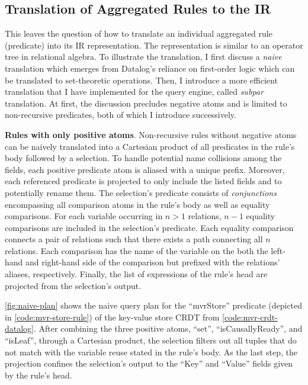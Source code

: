 \subsection{Translation of Aggregated Rules to the \acs{IR}}

This leaves the question of how to translate an individual aggregated rule
(predicate) into its \ac{IR} representation.
The representation is similar to an operator tree in relational algebra.
To illustrate the translation, I first discuss a \emph{naive} translation
which emerges from Datalog's reliance on first-order logic which can be
translated to set-theoretic operations.
Then, I introduce a more efficient translation that I have implemented
for the query engine, called \emph{subpar} translation.
At first, the discussion precludes negative atoms and is limited to
non-recursive predicates, both of which I introduce successively.

\textbf{Rules with only positive atoms}.
Non-recursive rules without negative atoms can be naively translated
into a Cartesian product of all predicates in the rule's body followed by
a selection.
To handle potential name collisions among the fields,
each positive predicate atom is aliased with a unique prefix.
Moreover, each referenced predicate is projected to only include the listed
fields and to potentially rename them.
The selection's predicate consists of \emph{conjunctions}
encompassing all comparison atoms in the rule's body as well as equality comparisons.
For each variable occurring in \(n > 1\) relations, \(n - 1\) equality comparisons
are included in the selection's predicate.
Each equality comparison connects a pair of relations such that there exists
a path connecting all \(n\) relations.
Each comparison has the name of the variable on the both the left-hand and right-hand
side of the comparison but prefixed with the relations' aliases, respectively.
Finally, the list of expressions of the rule's head are projected from the
selection's output.

\ref{fig:naive-plan} shows the naive query plan for the ``mvrStore'' predicate
(depicted in \ref{code:mvr-store-rule})
of the key-value store \ac{CRDT} from \ref{code:mvr-crdt-datalog}.
After combining the three positive atoms, ``set'', ``isCausallyReady'', and
``isLeaf'', through a Cartesian product, the selection filters out all tuples that
do not match with the variable reuse stated in the rule's body.
As the last step, the projection confines the selection's output to the
``Key'' and ``Value'' fields given by the rule's head.

